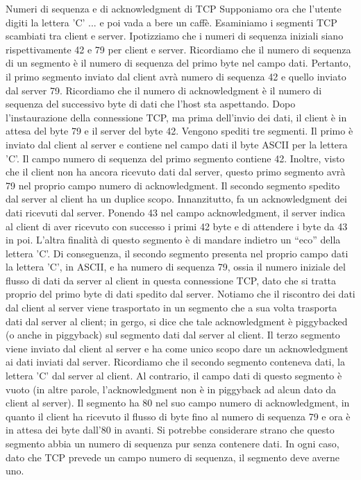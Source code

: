 \begin{Example}{Numeri di sequenza e di acknowledgment di TCP}{}
    Supponiamo ora che l'utente digiti la lettera 'C' ... e poi vada a bere un caffè. Esaminiamo i segmenti TCP scambiati tra client e server. Ipotizziamo che i numeri di sequenza iniziali siano rispettivamente 42 e 79 per client e server. Ricordiamo che il numero di sequenza di un segmento è il numero di sequenza del primo byte nel campo dati. Pertanto, il primo segmento inviato dal client avrà numero di sequenza 42 e quello inviato dal server 79. Ricordiamo che il numero di acknowledgment è il numero di sequenza del successivo byte di dati che l'host sta aspettando. Dopo l'instaurazione della connessione TCP, ma prima dell'invio dei dati, il client è in attesa del byte 79 e il server del byte 42. Vengono spediti tre segmenti. Il primo è inviato dal client al server e contiene nel campo dati il byte ASCII per la lettera 'C'. Il campo numero di sequenza del primo segmento contiene 42. Inoltre, visto che il client non ha ancora ricevuto dati dal server, questo primo segmento avrà 79 nel proprio campo numero di acknowledgment. Il secondo segmento spedito dal server al client ha un duplice scopo. Innanzitutto, fa un acknowledgment dei dati ricevuti dal server. Ponendo 43 nel campo acknowledgment, il server indica al client di aver ricevuto con successo i primi 42 byte e di attendere i byte da 43 in poi. L'altra finalità di questo segmento è di mandare indietro un “eco” della lettera 'C'. Di conseguenza, il secondo segmento presenta nel proprio campo dati la lettera 'C', in ASCII, e ha numero di sequenza 79, ossia il numero iniziale del flusso di dati da server al client in questa connessione TCP, dato che si tratta proprio del primo byte di dati spedito dal server. Notiamo che il riscontro dei dati dal client al server viene trasportato in un segmento che a sua volta trasporta dati dal server al client; in gergo, si dice che tale acknowledgment è piggybacked (o anche in piggyback) sul segmento dati dal server al client. Il terzo segmento viene inviato dal client al server e ha come unico scopo dare un acknowledgment ai dati inviati dal server. Ricordiamo che il secondo segmento conteneva dati, la lettera 'C' dal server al client. Al contrario, il campo dati di questo segmento è vuoto (in altre parole, l'acknowledgment non è in piggyback ad alcun dato da client al server). Il segmento ha 80 nel suo campo numero di acknowledgment, in quanto il client ha ricevuto il flusso di byte fino al numero di sequenza 79 e ora è in attesa dei byte dall'80 in avanti. Si potrebbe considerare strano che questo segmento abbia un numero di sequenza pur senza contenere dati. In ogni caso, dato che TCP prevede un campo numero di sequenza, il segmento deve averne uno.
\end{Example}

